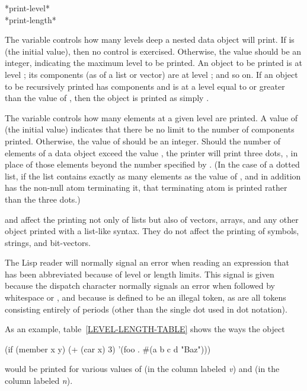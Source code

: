\begin{defun}[Variable]
*print-level* \\
*print-length*

The  variable controls how many levels deep a nested
data object will print.
If  is {\false} (the initial value), then no control is exercised.
Otherwise, the value should be an integer, indicating the maximum level to
be printed.  An object to be printed is at level ;
its components (as of a list or vector) are at level ; and so on.
If an object to be recursively printed has components and is at a level
equal to or greater than the value of , then the object
is printed as simply \cd{\#}.

The  variable controls how many elements at a given level
are printed.  A value of {\false} (the initial value) indicates that there
be no limit to the number of components printed.  Otherwise, the value of
 should be an integer.  Should the number of elements of a
data object exceed the value , the printer will print three
dots, , in place of those elements beyond the number specified
by .  (In the case of a dotted list, if the list contains
exactly as many elements as the value of , and in addition
has the non-null atom terminating it, that terminating atom is printed
rather than the three dots.)

 and  affect the printing not only of lists
but also of vectors, arrays, and any other object printed with
a list-like syntax.  They do not affect the printing of symbols,
strings, and bit-vectors.

The Lisp reader will normally signal an error when reading
an expression that has been abbreviated because of level or length limits.
This signal is given because the \cd{\#} dispatch character normally signals
an error when followed by whitespace or \cd{)}, and because 
is defined to be an illegal token, as are all tokens consisting
entirely of periods (other than the single dot used in dot notation).

As an example, table~\ref{LEVEL-LENGTH-TABLE} shows the ways the object
\begin{lisp}
(if (member x y) (+ (car x) 3) '(foo . \#(a b c d "Baz")))
\end{lisp}
would be printed for various values of 
(in the column labeled \emph{v}) and  (in the column labeled \emph{n}).
\end{defun}

